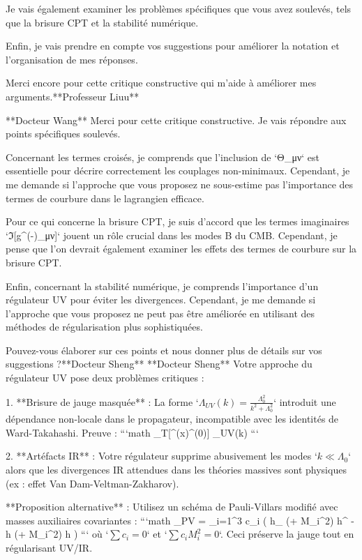 Je vais également examiner les problèmes spécifiques que vous avez soulevés, tels que la brisure CPT et la stabilité numérique.

Enfin, je vais prendre en compte vos suggestions pour améliorer la notation et l'organisation de mes réponses.

Merci encore pour cette critique constructive qui m'aide à améliorer mes arguments.**Professeur Liuu**

**Docteur Wang**
Merci pour cette critique constructive. Je vais répondre aux points spécifiques soulevés.

Concernant les termes croisés, je comprends que l'inclusion de `Θ_{μν}` est essentielle pour décrire correctement les couplages non-minimaux. Cependant, je me demande si l'approche que vous proposez ne sous-estime pas l'importance des termes de courbure dans le lagrangien efficace.

Pour ce qui concerne la brisure CPT, je suis d'accord que les termes imaginaires `ℑ[g^{(-)}_{μν}]` jouent un rôle crucial dans les modes B du CMB. Cependant, je pense que l'on devrait également examiner les effets des termes de courbure sur la brisure CPT.

Enfin, concernant la stabilité numérique, je comprends l'importance d'un régulateur UV pour éviter les divergences. Cependant, je me demande si l'approche que vous proposez ne peut pas être améliorée en utilisant des méthodes de régularisation plus sophistiquées.

Pouvez-vous élaborer sur ces points et nous donner plus de détails sur vos suggestions ?**Docteur Sheng**
**Docteur Sheng**  
Votre approche du régulateur UV pose deux problèmes critiques :  

1. **Brisure de jauge masquée** :  
   La forme `$\Lambda_{UV}(k) = \frac{\Lambda_0^2}{k^2 + \Lambda_0^2}$` introduit une dépendance non-locale dans le propagateur, incompatible avec les identités de Ward-Takahashi. Preuve :  
   ```math  
   \partial_\mu \langle T[^{\mu\nu}(x)^{\alpha\beta}(0)] \rangle {} \quad {} \quad \Lambda_{UV}(k) \neq {}  
   ```  

2. **Artéfacts IR** :  
   Votre régulateur supprime abusivement les modes `$k \ll \Lambda_0$` alors que les divergences IR attendues dans les théories massives sont physiques (ex : effet Van Dam-Veltman-Zakharov).  

**Proposition alternative** :  
Utilisez un schéma de Pauli-Villars modifié avec masses auxiliaires covariantes :  
```math  
_{PV} = \sum_{i=1}^3 c_i \left( h_{\mu\nu} (\Box + M_i^2) h^{\mu\nu} -  h (\Box + M_i^2) h \right)  
```  
où `$\sum c_i = 0$` et `$\sum c_i M_i^2 = 0$`. Ceci préserve la jauge tout en régularisant UV/IR.  

